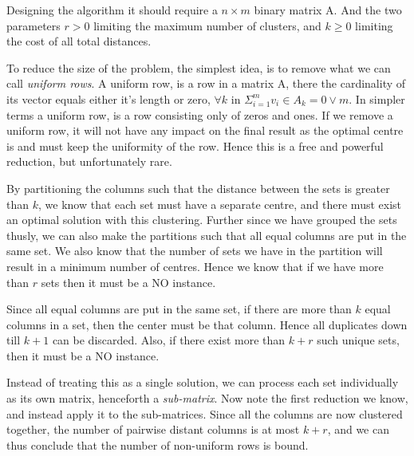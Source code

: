 \documentclass[a4paper]{article}
\begin{document}
Designing the algorithm it should require a $n \times m$ binary matrix A. And the two parameters $r > 0$ limiting the
maximum number of clusters, and $k \geq 0$ limiting the cost of all total distances.

To reduce the size of the problem, the simplest idea, is to remove what we can call \textit{uniform rows}. A uniform
row, is a row in a matrix A, there the cardinality of its vector equals either it's length or zero,
$\forall k$ in $\Sigma_{i=1}^{m} v_i \in A_k = 0 \vee m$. In simpler terms a uniform row, is a row consisting only of
zeros and ones. If we remove a uniform row, it will not have any impact on the final result as the optimal centre is
and must keep the uniformity of the row. Hence this is a free and powerful reduction, but unfortunately rare.

By partitioning the columns such that the distance between the sets is greater than $k$, we know that each set must
have a separate centre, and there must exist an optimal solution with this clustering. Further since we have
grouped the sets thusly, we can also make the partitions such that all equal columns are put in the same set. We also
know that the number of sets we have in the partition will result in a minimum number of centres. Hence we know that
if we have more than $r$ sets then it must be a NO instance.

Since all equal columns are put in the same set, if there are more than $k$ equal columns in a set, then the center
must be that column. Hence all duplicates down till $k+1$ can be discarded. Also, if there exist more than $k+r$
such unique sets, then it must be a NO instance.

Instead of treating this as a single solution, we can process each set individually as its own matrix, henceforth
a \textit{sub-matrix}. Now note the first reduction we know, and instead apply it to the sub-matrices. Since all
the columns are now clustered together, the number of pairwise distant columns is at most $k+r$, and we can thus
conclude that the number of non-uniform rows is bound.
\end{document}
